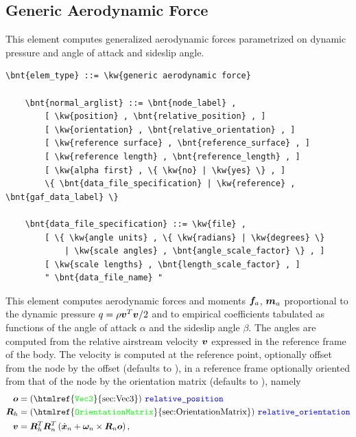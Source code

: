 \subsection{Generic Aerodynamic Force}
\label{sec:EL:AERO:GAF}
This element computes generalized aerodynamic forces parametrized
on dynamic pressure and angle of attack and sideslip angle.
\begin{Verbatim}[commandchars=\\\{\}]
    \bnt{elem_type} ::= \kw{generic aerodynamic force}

    \bnt{normal_arglist} ::= \bnt{node_label} ,
        [ \kw{position} , \bnt{relative_position} , ]
        [ \kw{orientation} , \bnt{relative_orientation} , ]
        [ \kw{reference surface} , \bnt{reference_surface} , ]
        [ \kw{reference length} , \bnt{reference_length} , ]
        [ \kw{alpha first} , \{ \kw{no} | \kw{yes} \} , ]
        \{ \bnt{data_file_specification} | \kw{reference} , \bnt{gaf_data_label} \}

    \bnt{data_file_specification} ::= \kw{file} , 
        [ \{ \kw{angle units} , \{ \kw{radians} | \kw{degrees} \}
            | \kw{scale angles} , \bnt{angle_scale_factor} \} , ]
        [ \kw{scale lengths} , \bnt{length_scale_factor} , ]
        " \bnt{data_file_name} "
\end{Verbatim}
This element computes aerodynamic forces and moments $\boldsymbol{f}_a$, $\boldsymbol{m}_a$
proportional to the dynamic pressure $q=\rho \boldsymbol{v}^T \boldsymbol{v}/2$
and to empirical coefficients tabulated as functions
of the angle of attack $\alpha$ and the sideslip angle $\beta$.
The angles are computed from the relative airstream velocity $\boldsymbol{v}$
expressed in the reference frame of the body.
The velocity is computed at the reference point, optionally offset
from the node  by the offset 
(defaults to ), in a reference frame optionally oriented
from that of the node  by the orientation matrix
 (defaults to ), namely
\begin{subequations}
\begin{align}
	\TT{o} &= \text{(\htmlref{\ty{Vec3}}{sec:Vec3})} \ \nt{relative\_position}
	\\
	\TT{R}_h &= \text{(\htmlref{\ty{OrientationMatrix}}{sec:OrientationMatrix})}\ \nt{relative\_orientation}
	\\
	\TT{v} &= \TT{R}_h^T \TT{R}_n^T \plbr{
		\dot{\T{x}}_n + \T{\omega}_n \times \TT{R}_n \TT{o}
	}
	,
\end{align}
\end{subequations}
